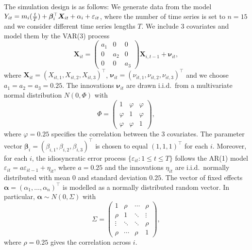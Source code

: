 \documentclass[12pt]{article}
\begin{document}
The simulation design is as follows: We generate data from the model $Y_{it} = m_i(\frac{t}{T}) + \bm{\beta}_i^\top \boldsymbol{X}_{it} +  \alpha_i  + \varepsilon_{it}$, where the number of time series is set to $n = 15$ and we consider different time series lengths $T$. We include $3$ covariates and model them by the VAR(3) process
\[ \boldsymbol{X}_{it} = \begin{pmatrix} a_1 & 0 & 0 \\ 0 & a_2 & 0 \\ 0 & 0 & a_3 \end{pmatrix} \boldsymbol{X}_{i,t-1} + \boldsymbol{\nu}_{it}, \] 
where $\boldsymbol{X}_{it} = ( X_{it,1}, X_{it,2}, X_{it,3} )^\top$, $\boldsymbol{\nu}_{it} = ( \nu_{it,1}, \nu_{it,2}, \nu_{it,3} )^\top$ and we choose $a_1 = a_2 = a_3 = 0.25$. The innovations $\boldsymbol{\nu}_{it}$ are drawn i.i.d.\ from a multivariate normal distribution $N(0,\Phi)$ with
\[ \Phi = \begin{pmatrix} 1 & \varphi & \varphi \\ \varphi & 1 & \varphi \\ \varphi & \varphi & 1 \end{pmatrix}, \]
where $\varphi = 0.25$ specifies the correlation between the 3 covariates.
The parameter vector $\boldsymbol{\beta}_i = (\beta_{i,1},\beta_{i,2},\beta_{i,3})^\top$ is chosen to equal $(1,1,1)^\top$ for each $i$. Moreover, for each $i$, the idiosyncratic error process $\{\varepsilon_{it}: 1 \le t \le T\}$ follows the AR(1) model $\varepsilon_{it} = a \varepsilon_{i t-1} + \eta_{it}$, where $a = 0.25$ and the innovations $\eta_{it}$ are i.i.d.\ normally distributed with mean $0$ and standard deviation $0.25$. 
The vector of fixed effects $\boldsymbol{\alpha} = (\alpha_1,\ldots,\alpha_n)^\top$ is modelled as a normally distributed random vector. In particular, $\boldsymbol{\alpha} \sim N(0,\Sigma)$ with
\[ \Sigma =
\begin{pmatrix}
1      & \rho   & \cdots & \rho   \\
\rho   & 1      & \ddots & \vdots \\
\vdots & \ddots & \ddots & \rho   \\
\rho   & \cdots & \rho   & 1
\end{pmatrix},
\]
where $\rho = 0.25$ gives the correlation across $i$.
\end{document}
